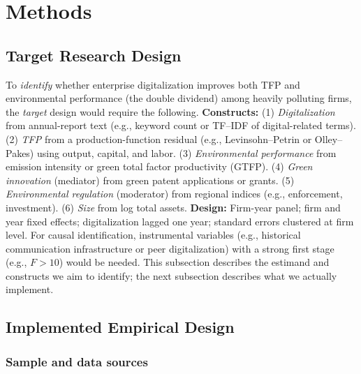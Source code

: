 
\section{Methods}
\label{sec:methods}

\subsection{Target Research Design}
\label{sec:target-design}

To \emph{identify} whether enterprise digitalization improves both TFP and environmental performance (the double dividend) among heavily polluting firms, the \emph{target} design would require the following. \textbf{Constructs:} (1) \emph{Digitalization} from annual-report text (e.g., keyword count or TF--IDF of digital-related terms). (2) \emph{TFP} from a production-function residual (e.g., Levinsohn--Petrin or Olley--Pakes) using output, capital, and labor. (3) \emph{Environmental performance} from emission intensity or green total factor productivity (GTFP). (4) \emph{Green innovation} (mediator) from green patent applications or grants. (5) \emph{Environmental regulation} (moderator) from regional indices (e.g., enforcement, investment). (6) \emph{Size} from log total assets. \textbf{Design:} Firm-year panel; firm and year fixed effects; digitalization lagged one year; standard errors clustered at firm level. For causal identification, instrumental variables (e.g., historical communication infrastructure or peer digitalization) with a strong first stage (e.g., $F > 10$) would be needed. This subsection describes the estimand and constructs we aim to identify; the next subsection describes what we actually implement.

\subsection{Implemented Empirical Design}
\label{sec:implemented-design}

\subsubsection{Sample and data sources}


